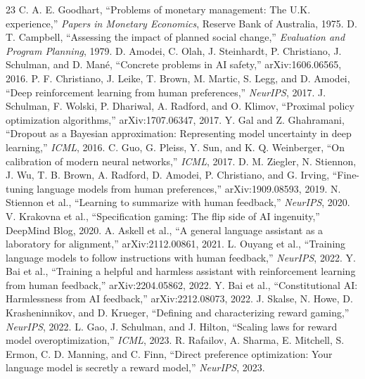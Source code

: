 \documentclass[11pt]{article}
\begin{document}
\begin{thebibliography}{23}
 C. A. E. Goodhart, ``Problems of monetary management: The U.K. experience,'' \emph{Papers in Monetary Economics}, Reserve Bank of Australia, 1975.
 D. T. Campbell, ``Assessing the impact of planned social change,'' \emph{Evaluation and Program Planning}, 1979.
 D. Amodei, C. Olah, J. Steinhardt, P. Christiano, J. Schulman, and D. Man\'{e}, ``Concrete problems in AI safety,'' arXiv:1606.06565, 2016.
 P. F. Christiano, J. Leike, T. Brown, M. Martic, S. Legg, and D. Amodei, ``Deep reinforcement learning from human preferences,'' \emph{NeurIPS}, 2017.
 J. Schulman, F. Wolski, P. Dhariwal, A. Radford, and O. Klimov, ``Proximal policy optimization algorithms,'' arXiv:1707.06347, 2017.
 Y. Gal and Z. Ghahramani, ``Dropout as a Bayesian approximation: Representing model uncertainty in deep learning,'' \emph{ICML}, 2016.
 C. Guo, G. Pleiss, Y. Sun, and K. Q. Weinberger, ``On calibration of modern neural networks,'' \emph{ICML}, 2017.
 D. M. Ziegler, N. Stiennon, J. Wu, T. B. Brown, A. Radford, D. Amodei, P. Christiano, and G. Irving, ``Fine-tuning language models from human preferences,'' arXiv:1909.08593, 2019.
 N. Stiennon et al., ``Learning to summarize with human feedback,'' \emph{NeurIPS}, 2020.
 V. Krakovna et al., ``Specification gaming: The flip side of AI ingenuity,'' DeepMind Blog, 2020.
 A. Askell et al., ``A general language assistant as a laboratory for alignment,'' arXiv:2112.00861, 2021.
 L. Ouyang et al., ``Training language models to follow instructions with human feedback,'' \emph{NeurIPS}, 2022.
 Y. Bai et al., ``Training a helpful and harmless assistant with reinforcement learning from human feedback,'' arXiv:2204.05862, 2022.
 Y. Bai et al., ``Constitutional AI: Harmlessness from AI feedback,'' arXiv:2212.08073, 2022.
 J. Skalse, N. Howe, D. Krasheninnikov, and D. Krueger, ``Defining and characterizing reward gaming,'' \emph{NeurIPS}, 2022.
 L. Gao, J. Schulman, and J. Hilton, ``Scaling laws for reward model overoptimization,'' \emph{ICML}, 2023.
 R. Rafailov, A. Sharma, E. Mitchell, S. Ermon, C. D. Manning, and C. Finn, ``Direct preference optimization: Your language model is secretly a reward model,'' \emph{NeurIPS}, 2023.

\end{thebibliography}
\end{document}
